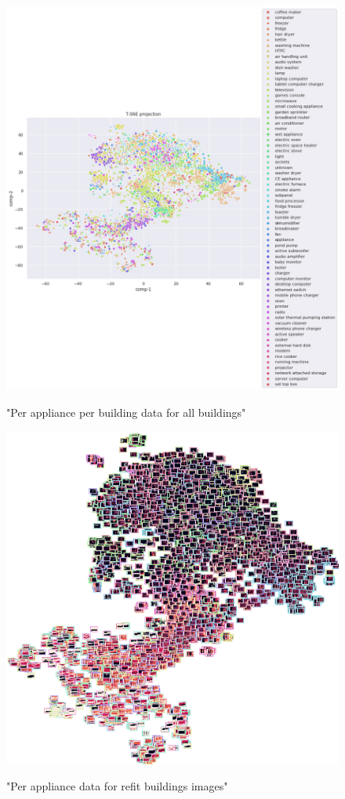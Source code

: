 \begin{figure}[H]
	\centering
	\caption{"Per appliance per building data for all buildings"}
	\includegraphics[width=1.2\textwidth]{Figures/TSNE/TSNE_results/all/scatter_all_all_lgimgs.png}
	\label{fig:tsne_papb_scatter_all}
\end{figure}

\begin{figure}[H]
	\centering
	\caption{"Per appliance data for refit buildings images"}
	\includegraphics[width=.9\textwidth]{Figures/TSNE/TSNE_results/all/img_scatter_allall_lgimgs.png}
	\label{fig:tsne_papb_img_scatter_all}
\end{figure}

